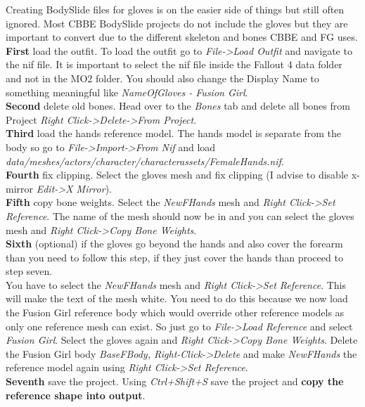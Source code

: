 Creating BodySlide files for gloves is on the easier side of things but still often ignored. Most CBBE BodySlide projects do not 
include the gloves but they are important to convert due to the different skeleton and bones CBBE and FG uses.\\
\textbf{First} load the outfit. To load the outfit go to \textit{File->Load Outfit} and navigate to the nif file. It is important 
to select the nif file inside the Fallout 4 data folder and not in the MO2 folder. You should also change the Display Name to 
something meaningful like \textit{NameOfGloves - Fusion Girl}.\\
\textbf{Second} delete old bones. Head over to the \textit{Bones} tab and delete all bones from Project \textit{Right Click->Delete->From Project}.\\
\textbf{Third} load the hands reference model. The hands model is separate from the body so go to \textit{File->Import->From Nif} and
load \textit{data/meshes/actors/character/characterassets/FemaleHands.nif}.\\
\textbf{Fourth} fix clipping. Select the gloves mesh and fix clipping (I advise to disable x-mirror \textit{Edit->X Mirror}).\\
\textbf{Fifth} copy bone weights. Select the \textit{NewFHands} mesh and \textit{Right Click->Set Reference}. The name of the mesh
should now be in {\color{green}{green}} and you can select the gloves mesh and \textit{Right Click->Copy Bone Weights}.\\
\textbf{Sixth} (optional) if the gloves go beyond the hands and also cover the forearm than you need to follow this step, if they just 
cover the hands than proceed to step seven.\\ You have to select the \textit{NewFHands} mesh and \textit{Right Click->Set Reference}. This 
will make the text of the mesh white. You need to do this because we now load the Fusion Girl reference body which would override other 
reference models as only one reference mesh can exist. So just go to \textit{File->Load Reference} and select \textit{Fusion Girl}. Select 
the gloves again and \textit{Right Click->Copy Bone Weights}. Delete the Fusion Girl body \textit{BaseFBody, Right-Click->Delete} and 
make \textit{NewFHands} the reference model again using \textit{Right Click->Set Reference}.\\
\textbf{Seventh} save the project. Using \textit{Ctrl+Shift+S} save the project and \textbf{copy the reference shape into output}.